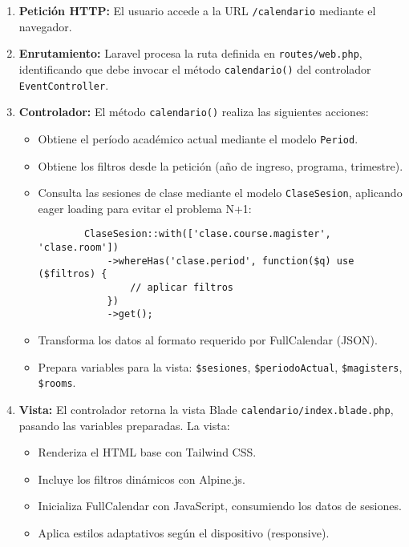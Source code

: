 \begin{enumerate}
    \item \textbf{Petición HTTP:} El usuario accede a la URL \texttt{/calendario} mediante el navegador.
    
    \item \textbf{Enrutamiento:} Laravel procesa la ruta definida en \texttt{routes/web.php}, identificando que debe invocar el método \texttt{calendario()} del controlador \texttt{EventController}.
    
    \item \textbf{Controlador:} El método \texttt{calendario()} realiza las siguientes acciones:
    \begin{itemize}
        \item Obtiene el período académico actual mediante el modelo \texttt{Period}.
        \item Obtiene los filtros desde la petición (año de ingreso, programa, trimestre).
        \item Consulta las sesiones de clase mediante el modelo \texttt{ClaseSesion}, aplicando eager loading para evitar el problema N+1:
        \begin{verbatim}
        ClaseSesion::with(['clase.course.magister', 'clase.room'])
            ->whereHas('clase.period', function($q) use ($filtros) {
                // aplicar filtros
            })
            ->get();
        \end{verbatim}
        \item Transforma los datos al formato requerido por FullCalendar (JSON).
        \item Prepara variables para la vista: \texttt{\$sesiones}, \texttt{\$periodoActual}, \texttt{\$magisters}, \texttt{\$rooms}.
    \end{itemize}
    
    \item \textbf{Vista:} El controlador retorna la vista Blade \texttt{calendario/index.blade.php}, pasando las variables preparadas. La vista:
    \begin{itemize}
        \item Renderiza el HTML base con Tailwind CSS.
        \item Incluye los filtros dinámicos con Alpine.js.
        \item Inicializa FullCalendar con JavaScript, consumiendo los datos de sesiones.
        \item Aplica estilos adaptativos según el dispositivo (responsive).
    \end{itemize}
    

\end{enumerate}
